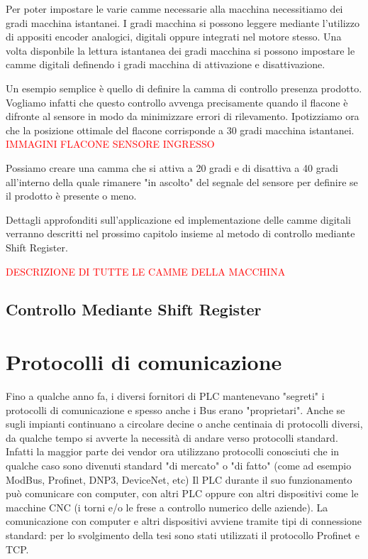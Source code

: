 \documentclass[12pt, a4paper, oneside]{book}
\begin{document}
Per poter impostare le varie camme necessarie alla macchina necessitiamo dei gradi macchina istantanei. I gradi macchina si possono leggere mediante l'utilizzo di appositi encoder analogici, digitali oppure integrati nel motore stesso.
Una volta disponbile la lettura istantanea dei gradi macchina si possono impostare le camme digitali definendo i gradi macchina di attivazione e disattivazione. 

Un esempio semplice è quello di definire la camma di controllo presenza prodotto. Vogliamo infatti che questo controllo avvenga precisamente quando il flacone è difronte al sensore in modo da minimizzare errori di rilevamento.
Ipotizziamo ora che la posizione ottimale del flacone corrisponde a 30 gradi macchina istantanei. 
\textcolor{red}{IMMAGINI FLACONE SENSORE INGRESSO}

Possiamo creare una camma che si attiva a 20 gradi e di disattiva a 40 gradi all'interno della quale rimanere "in ascolto" del segnale del sensore per definire se il prodotto è presente o meno.

Dettagli approfonditi sull'applicazione ed implementazione delle camme digitali verranno descritti nel prossimo capitolo insieme al metodo di controllo mediante Shift Register. 

\textcolor{red}{DESCRIZIONE DI TUTTE LE CAMME DELLA MACCHINA}






\section{Controllo Mediante Shift Register}


\chapter{Protocolli di comunicazione}
Fino a qualche anno fa, i diversi fornitori di PLC mantenevano "segreti" i protocolli di comunicazione e spesso anche i Bus erano "proprietari". Anche se sugli impianti continuano a circolare decine o anche centinaia di protocolli diversi, da qualche tempo si avverte la necessità di andare verso protocolli standard. Infatti la maggior parte dei vendor ora utilizzano protocolli conosciuti che in qualche caso sono divenuti standard "di mercato" o "di fatto" (come ad esempio ModBus, Profinet, DNP3, DeviceNet, etc)
Il PLC durante il suo funzionamento può comunicare con computer, con altri PLC oppure con altri dispositivi come le macchine CNC (i torni e/o le frese a controllo numerico delle aziende). La comunicazione con computer e altri dispositivi avviene tramite tipi di connessione standard: per lo svolgimento della tesi sono stati utilizzati il protocollo Profinet e TCP.
\end{document}
